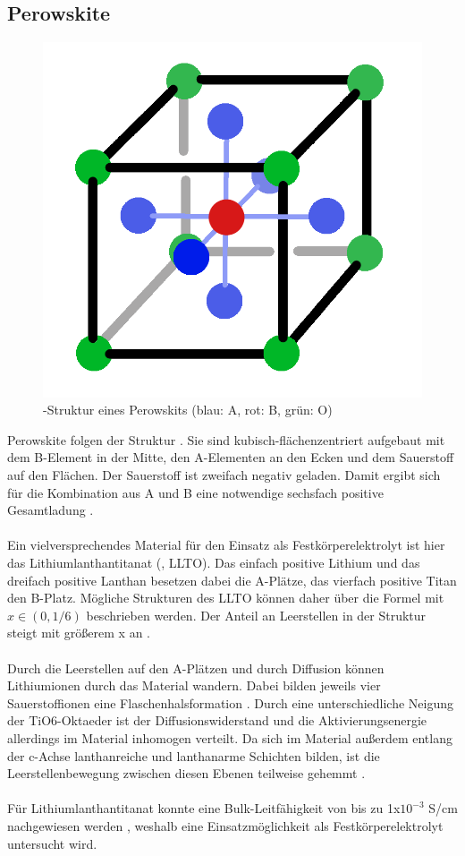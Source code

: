 \documentclass[a4paper, 11pt, headsepline,footsepline,twoside,abstract]{scrbook}
\begin{document}
\subsection{Perowskite}
\begin{figure}
	\centering
	\includegraphics[width=0.45\columnwidth]{images/Perowskit-Struktur.png}
	\caption{-Struktur eines Perowskits (blau: A, rot: B, grün: O)}
	\label{struktur-perowskit}
\end{figure}
Perowskite folgen der Struktur . Sie sind kubisch-flächenzentriert aufgebaut mit dem B-Element in der Mitte, den A-Elementen an den Ecken und dem Sauerstoff auf den Flächen. Der Sauerstoff ist zweifach negativ geladen. Damit ergibt sich für die Kombination aus A und B eine notwendige sechsfach positive Gesamtladung \cite{ishihara2009perovskite}.
\\\\
Ein vielversprechendes Material für den Einsatz als Festkörperelektrolyt ist hier das Lithiumlanthantitanat (, LLTO). Das einfach positive Lithium und das dreifach positive Lanthan besetzen dabei die A-Plätze, das vierfach positive Titan den B-Platz. Mögliche Strukturen des LLTO können daher über die Formel  mit $x \in (0, 1/6)$ beschrieben werden. Der Anteil an Leerstellen in der Struktur steigt mit größerem x an \cite{chen2015lithium}.
\\\\
Durch die Leerstellen auf den A-Plätzen und durch Diffusion können Lithiumionen durch das Material wandern. Dabei bilden jeweils vier Sauerstoffionen eine Flaschenhalsformation \cite{cao2014recent}. Durch eine unterschiedliche Neigung der TiO6-Oktaeder ist der Diffusionswiderstand und die Aktivierungsenergie allerdings im Material inhomogen verteilt. Da sich im Material außerdem entlang der c-Achse lanthanreiche und lanthanarme Schichten bilden, ist die Leerstellenbewegung zwischen diesen Ebenen teilweise gehemmt \cite{jay2015genetics}.
\\\\
Für Lithiumlanthantitanat konnte eine Bulk-Leitfähigkeit von bis zu 1x$10^{-3}$ S/cm nachgewiesen werden \cite{stramare2003lithium}, weshalb eine Einsatzmöglichkeit als Festkörperelektrolyt untersucht wird.
\end{document}
